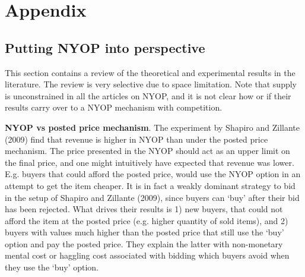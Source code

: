 \documentclass[a4paper,12pt]{article}
\begin{document}
	\newpage
	\section{Appendix}
	
	\subsection{Putting NYOP into perspective}
	\label{app:perspective}

	This section contains a review of the theoretical and experimental results in the literature. The review is very selective due to space limitation. Note that supply is unconstrained in all the articles on NYOP, and it is not clear how or if their results carry over to a NYOP mechanism with competition.

	{\bf NYOP vs posted price mechanism}. The experiment by Shapiro and Zillante (2009) find that revenue is higher in NYOP than under the posted price mechanism. The price presented in the NYOP should act as an upper limit on the final price, and one might intuitively have expected that revenue was lower. E.g. buyers that could afford the posted price, would use the NYOP option in an attempt to get the item cheaper. It is in fact a weakly dominant strategy to bid in the setup of Shapiro and Zillante (2009), since buyers can `buy' after their bid has been rejected. What drives their results is 1) new buyers, that could not afford the item at the posted price (e.g. higher quantity of sold items), and 2) buyers with values much higher than the posted price that still use the `buy' option and pay the posted price. They explain the latter with non-monetary mental cost or haggling cost associated with bidding which buyers avoid when they use the `buy' option.
\end{document}
